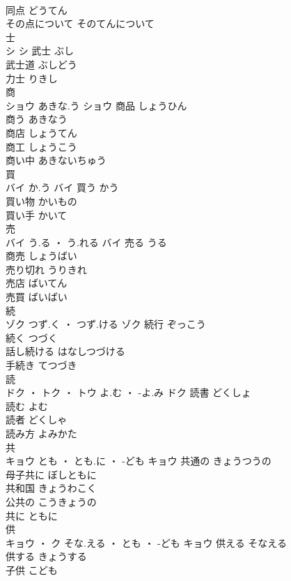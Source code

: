 \documentclass[8pt]{extreport}
\begin{document}
\begin{CJK}{UTF8}{min}
\\	同点	どうてん	
\\	その点について	そのてんについて	
\\	士	
\\	シ		シ	武士	ぶし	
\\	武士道	ぶしどう	
\\	力士	りきし	
\\	商	
\\	ショウ	あきな.う	ショウ	商品	しょうひん	
\\	商う	あきなう	
\\	商店	しょうてん	
\\	商工	しょうこう	
\\	商い中	あきないちゅう	
\\	買	
\\	バイ	か.う	バイ	買う	かう	
\\	買い物	かいもの	
\\	買い手	かいて	
\\	売	
\\	バイ	う.る ・ う.れる	バイ	売る	うる	
\\	商売	しょうばい	
\\	売り切れ	うりきれ	
\\	売店	ばいてん	
\\	売買	ばいばい	
\\	続	
\\	ゾク	つず.く ・ つず.ける	ゾク	続行	ぞっこう	
\\	続く	つづく	
\\	話し続ける	はなしつづける	
\\	手続き	てつづき	
\\	読	
\\	ドク ・ トク ・ トウ	よ.む ・ -よ.み	ドク	読書	どくしょ	
\\	読む	よむ	
\\	読者	どくしゃ	
\\	読み方	よみかた	
\\	共	
\\	キョウ	とも ・ とも.に ・ -ども	キョウ	共通の	きょうつうの	
\\	母子共に	ぼしともに	
\\	共和国	きょうわこく	
\\	公共の	こうきょうの	
\\	共に	ともに	
\\	供	
\\	キョウ ・ ク	そな.える ・ とも ・ -ども	キョウ	供える	そなえる	
\\	供する	きょうする	
\\	子供	こども	

\end{CJK}
\end{document}
